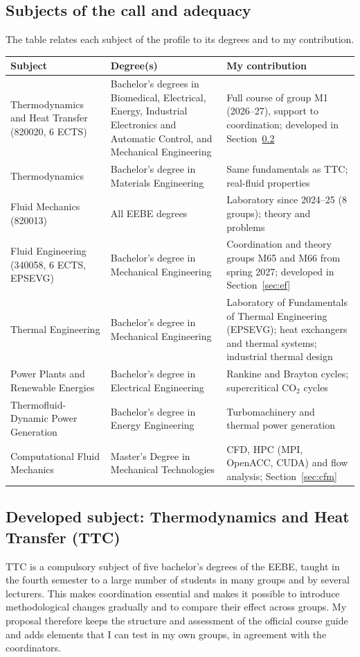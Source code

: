 \documentclass[11pt]{article}
\begin{document}
\subsection{Subjects of the call and adequacy}
The table relates each subject of the profile to its degrees and to my contribution.
\begin{center}\small
\begin{tabularx}{\textwidth}{@{}>{\raggedright\arraybackslash}p{3.7cm}>{\raggedright\arraybackslash}p{3.9cm}X@{}}
\toprule
\textbf{Subject} & \textbf{Degree(s)} & \textbf{My contribution} \\
\midrule
Thermodynamics and Heat Transfer (820020, 6 ECTS) & Bachelor's degrees in Biomedical, Electrical, Energy, Industrial Electronics and Automatic Control, and Mechanical Engineering & Full course of group M1 (2026--27), support to coordination; developed in Section~\ref{sec:ttc} \\
Thermodynamics & Bachelor's degree in Materials Engineering & Same fundamentals as TTC; real-fluid properties \\
Fluid Mechanics (820013) & All EEBE degrees & Laboratory since 2024--25 (8 groups); theory and problems \\
Fluid Engineering (340058, 6 ECTS, EPSEVG) & Bachelor's degree in Mechanical Engineering & Coordination and theory groups M65 and M66 from spring 2027; developed in Section~\ref{sec:ef} \\
Thermal Engineering & Bachelor's degree in Mechanical Engineering & Laboratory of Fundamentals of Thermal Engineering (EPSEVG); heat exchangers and thermal systems; industrial thermal design \\
Power Plants and Renewable Energies & Bachelor's degree in Electrical Engineering & Rankine and Brayton cycles; supercritical CO$_2$ cycles \\
Thermofluid-Dynamic Power Generation & Bachelor's degree in Energy Engineering & Turbomachinery and thermal power generation \\
Computational Fluid Mechanics & Master's Degree in Mechanical Technologies & CFD, HPC (MPI, OpenACC, CUDA) and flow analysis; Section~\ref{sec:cfm} \\
\bottomrule
\end{tabularx}
\end{center}

\subsection{Developed subject: Thermodynamics and Heat Transfer (TTC)}\label{sec:ttc}
TTC is a compulsory subject of five bachelor's degrees of the EEBE, taught in the fourth
semester to a large number of students in many groups and by several lecturers. This
makes coordination essential and makes it possible to introduce methodological changes
gradually and to compare their effect across groups. My proposal therefore keeps the
structure and assessment of the official course guide and adds elements that I can test
in my own groups, in agreement with the coordinators.
\end{document}
